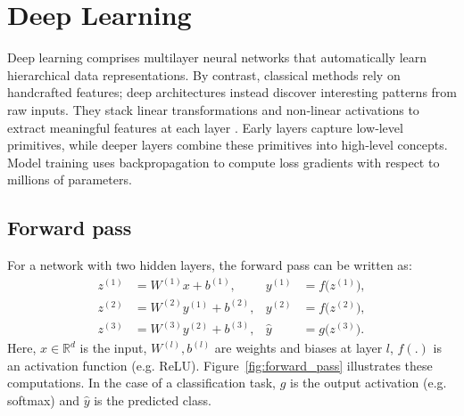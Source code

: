 \section{Deep Learning}
\label{sec:deep_learning}

Deep learning comprises multilayer neural networks that automatically learn hierarchical data representations. By contrast, classical methods rely on handcrafted features; deep architectures instead discover interesting patterns from raw inputs. They stack linear transformations and non‑linear activations to extract meaningful features at each layer \cite{lecun_deep_learning_2015}. 
Early layers capture low‑level primitives, while deeper layers combine these primitives into high‑level concepts. Model training uses backpropagation to compute loss gradients with respect to millions of parameters. %

\subsection{Forward pass}
For a network with two hidden layers, the forward pass can be written as:
\begin{align}
z^{(1)} &= W^{(1)} x + b^{(1)}, & y^{(1)} &= f\bigl(z^{(1)}\bigr), \\
z^{(2)} &= W^{(2)} y^{(1)} + b^{(2)}, & y^{(2)} &= f\bigl(z^{(2)}\bigr), \\
z^{(3)} &= W^{(3)} y^{(2)} + b^{(3)}, & \hat{y} &= g\bigl(z^{(3)}\bigr).
\end{align}
Here, \(x\in\mathbb{R}^d\) is the input, \(W^{(l)},b^{(l)}\) are weights and biases at layer \(l\), \(f(.)\) is an activation function (e.g. ReLU). Figure~\ref{fig:forward_pass} illustrates these computations. In the case of a classification task, \(g\) is the output activation (e.g. softmax) and \(\hat{y}\) is the predicted class.

